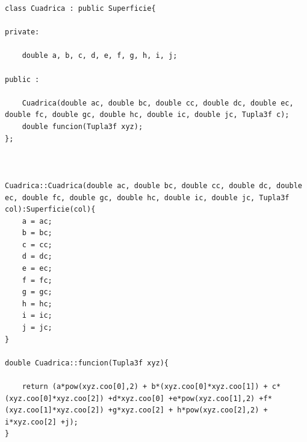 \begin{lstlisting}[style=Consola]
class Cuadrica : public Superficie{

private:

	double a, b, c, d, e, f, g, h, i, j;

public :

	Cuadrica(double ac, double bc, double cc, double dc, double ec, double fc, double gc, double hc, double ic, double jc, Tupla3f c);
	double funcion(Tupla3f xyz);
};



Cuadrica::Cuadrica(double ac, double bc, double cc, double dc, double ec, double fc, double gc, double hc, double ic, double jc, Tupla3f col):Superficie(col){
	a = ac;
	b = bc;
	c = cc;
	d = dc;
	e = ec;
	f = fc;
	g = gc;
	h = hc;
	i = ic;
	j = jc;
}

double Cuadrica::funcion(Tupla3f xyz){

	return (a*pow(xyz.coo[0],2) + b*(xyz.coo[0]*xyz.coo[1]) + c*(xyz.coo[0]*xyz.coo[2]) +d*xyz.coo[0] +e*pow(xyz.coo[1],2) +f*(xyz.coo[1]*xyz.coo[2]) +g*xyz.coo[2] + h*pow(xyz.coo[2],2) + i*xyz.coo[2] +j);
}
\end{lstlisting}





